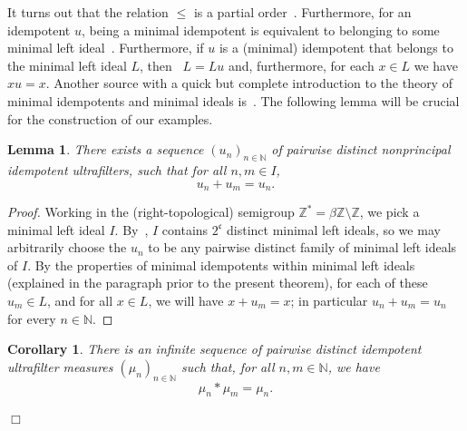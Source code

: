 \documentclass{jloganal}
\newtheorem{lem}[thm]{Lemma}          %
\newtheorem{cor}[thm]{Corollary}          %
\theoremstyle{definition}
\begin{document}
It turns out that the relation $\leq$ is a partial order~\cite[Remark 1.35]{Hindman-Strauss}. Furthermore, for an idempotent $u$, being a minimal idempotent is equivalent to belonging to some minimal left ideal~\cite[Theorem 1.38]{Hindman-Strauss}. Furthermore, if $u$ is a (minimal) idempotent that belongs to the minimal left ideal $L$, then~\cite[Lemma 1.52]{Hindman-Strauss} $L=Lu$ and, furthermore, for each $x\in L$ we have $xu=x$. Another source with a quick but complete introduction to the theory of minimal idempotents and minimal ideals is~\cite{Stevo2010}. The following lemma will be crucial for the construction of our examples.

\begin{lem}\label{lem:absorbing-idempotents}
    There exists a sequence  $(u_n)_{n\in\mathbb N}$ of pairwise distinct nonprincipal idempotent ultrafilters, such that for all $n,m\in I$,
    \begin{equation*}
        u_n+u_m=u_n.
    \end{equation*}
\end{lem}

\begin{proof}
    Working in the (right-topological) semigroup $\mathbb Z^*=\beta\mathbb Z\setminus\mathbb Z$, we pick a minimal left ideal $I$. By~\cite[Theorem 6.9]{Hindman-Strauss}, $I$ contains $2^{\mathfrak c}$ distinct minimal left ideals, so we may arbitrarily choose the $u_n$ to be any pairwise distinct family of minimal left ideals of $I$. By the properties of minimal idempotents within minimal left ideals (explained in the paragraph prior to the present theorem), for each of these $u_m\in L$, and for all $x\in L$, we will have $x+u_m=x$; in particular $u_n+u_m=u_n$ for every $n\in\mathbb N$. 
\end{proof}


\begin{cor}\label{convexcombinations}
    There is an infinite sequence of pairwise distinct idempotent ultrafilter measures $(\mu_n)_{n\in\mathbb N}$ such that, for all $n,m\in\mathbb N$, we have
    \begin{equation*}
        \mu_n*\mu_m=\mu_n.
    \end{equation*}
\end{cor}

\hfill$\Box$
\end{document}
